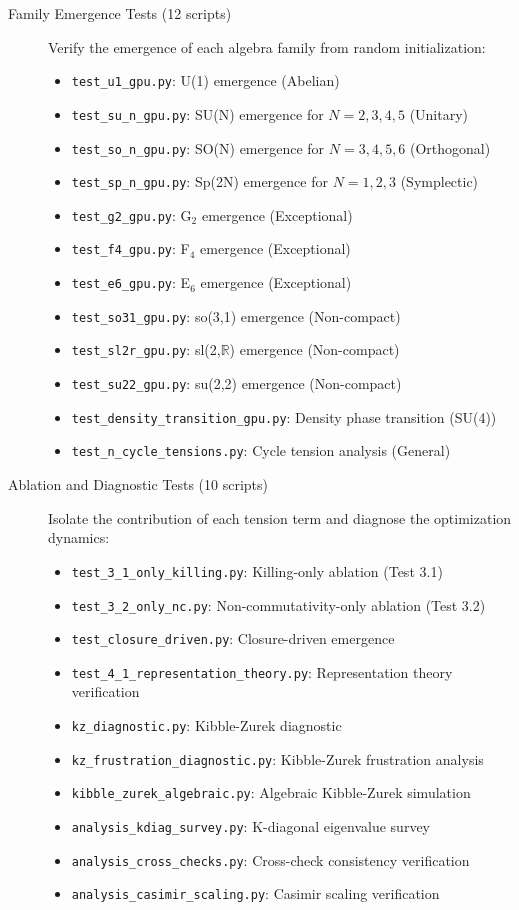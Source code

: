 \begin{description}
\item[Family Emergence Tests (12 scripts)] Verify the emergence of each algebra family from random initialization:
\begin{itemize}
\item \texttt{test\_u1\_gpu.py}: U(1) emergence (Abelian)
\item \texttt{test\_su\_n\_gpu.py}: SU(N) emergence for $N = 2, 3, 4, 5$ (Unitary)
\item \texttt{test\_so\_n\_gpu.py}: SO(N) emergence for $N = 3, 4, 5, 6$ (Orthogonal)
\item \texttt{test\_sp\_n\_gpu.py}: Sp(2N) emergence for $N = 1, 2, 3$ (Symplectic)
\item \texttt{test\_g2\_gpu.py}: G$_2$ emergence (Exceptional)
\item \texttt{test\_f4\_gpu.py}: F$_4$ emergence (Exceptional)
\item \texttt{test\_e6\_gpu.py}: E$_6$ emergence (Exceptional)
\item \texttt{test\_so31\_gpu.py}: so(3,1) emergence (Non-compact)
\item \texttt{test\_sl2r\_gpu.py}: sl(2,$\mathbb{R}$) emergence (Non-compact)
\item \texttt{test\_su22\_gpu.py}: su(2,2) emergence (Non-compact)
\item \texttt{test\_density\_transition\_gpu.py}: Density phase transition (SU(4))
\item \texttt{test\_n\_cycle\_tensions.py}: Cycle tension analysis (General)
\end{itemize}

\item[Ablation and Diagnostic Tests (10 scripts)] Isolate the contribution of each tension term and diagnose the optimization dynamics:
\begin{itemize}
\item \texttt{test\_3\_1\_only\_killing.py}: Killing-only ablation (Test 3.1)
\item \texttt{test\_3\_2\_only\_nc.py}: Non-commutativity-only ablation (Test 3.2)
\item \texttt{test\_closure\_driven.py}: Closure-driven emergence
\item \texttt{test\_4\_1\_representation\_theory.py}: Representation theory verification
\item \texttt{kz\_diagnostic.py}: Kibble-Zurek diagnostic
\item \texttt{kz\_frustration\_diagnostic.py}: Kibble-Zurek frustration analysis
\item \texttt{kibble\_zurek\_algebraic.py}: Algebraic Kibble-Zurek simulation
\item \texttt{analysis\_kdiag\_survey.py}: K-diagonal eigenvalue survey
\item \texttt{analysis\_cross\_checks.py}: Cross-check consistency verification
\item \texttt{analysis\_casimir\_scaling.py}: Casimir scaling verification
\end{itemize}


\end{description}
